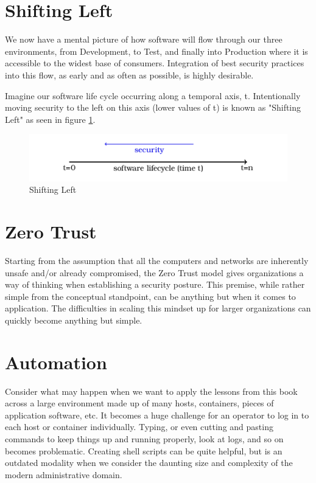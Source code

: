\section{Shifting Left}

\justify
We now have a mental picture of how software will flow through our
three environments, from Development, to Test, and finally into Production
where it is accessible to the widest base of consumers. Integration of
best security practices into this flow, as early and as often as possible,
is highly desirable.

\justify
Imagine our software life cycle occurring along a temporal
axis, t. Intentionally moving security to the left on this axis (lower
values of t) is known as "Shifting Left" as seen in
figure \ref{fig:shift}.

\justify
\begin{figure}[!htb]
	\centering
	\includegraphics{../images/shift_left.png}
	\caption{Shifting Left}
	\label{fig:shift}
\end{figure}

\section{Zero Trust}

\justify
Starting from the assumption that all the computers and networks are
inherently unsafe and/or already compromised, the Zero Trust
model gives organizations a way of thinking when establishing a security
posture. \cite{zerotrust} This premise, while rather simple from
the conceptual standpoint, can be anything but when it comes to
application. The difficulties in scaling this mindset up for larger
organizations can quickly become anything but simple.

\section{Automation}

\justify
Consider what may happen when we want to apply the lessons from this book
across a large environment made up of many hosts, containers, pieces of
application software, etc. It becomes a huge challenge for an operator
to log in to each host or container individually. Typing, or even cutting
and pasting commands to keep things up and running properly, look at logs,
and so on becomes problematic. Creating shell scripts can be quite helpful,
but is an outdated modality when we consider the daunting size and complexity
of the modern administrative domain.


